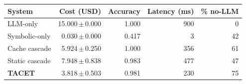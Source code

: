 \begin{tabular}{lrrrr}
\toprule
System & Cost (USD) & Accuracy & Latency (ms) & \% no-LLM \\
\midrule
LLM-only & 15.000\,$\pm$\,0.000 & 1.000 & 900 & 0 \\
Symbolic-only & 0.030\,$\pm$\,0.000 & 0.417 & 3 & 42 \\
Cache cascade & 5.924\,$\pm$\,0.250 & 1.000 & 356 & 61 \\
Static cascade & 7.948\,$\pm$\,0.838 & 0.983 & 477 & 47 \\
\textbf{TACET} & 3.818\,$\pm$\,0.503 & 0.981 & 230 & 75 \\
\bottomrule
\end{tabular}
